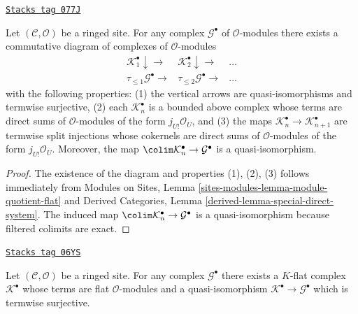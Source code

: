 \begin{lemma}
\label{sites-cohomology-lemma-resolution-by-direct-sums-extensions-by-zero}
\href{https://stacks.math.columbia.edu/tag/077J}{\texttt{Stacks tag 077J}}

Let $(\mathcal{C}, \mathcal{O})$ be a ringed site.
For any complex $\mathcal{G}^\bullet$ of $\mathcal{O}$-modules
there exists a commutative diagram of complexes of $\mathcal{O}$-modules
$$
\begin{array}{ccc}\mathcal{K}_1^\bullet \downarrow\longrightarrow & \mathcal{K}_2^\bullet \downarrow\longrightarrow & \ldots \\ \tau_{\leq 1}\mathcal{G}^\bullet \longrightarrow & \tau_{\leq 2}\mathcal{G}^\bullet \longrightarrow & \ldots\end{array}
$$
with the following properties: (1) the vertical arrows are quasi-isomorphisms
and termwise surjective,
(2) each $\mathcal{K}_n^\bullet$ is a bounded above complex whose terms
are direct sums of $\mathcal{O}$-modules of the form $j_{U!}\mathcal{O}_U$, and
(3) the maps $\mathcal{K}_n^\bullet \to \mathcal{K}_{n + 1}^\bullet$ are
termwise split injections whose cokernels are direct sums of
$\mathcal{O}$-modules of the form $j_{U!}\mathcal{O}_U$. Moreover, the map
$\colim \mathcal{K}_n^\bullet \to \mathcal{G}^\bullet$ is a quasi-isomorphism.
\end{lemma}

\begin{proof}
The existence of the diagram and properties (1), (2), (3) follows immediately
from
Modules on Sites, Lemma \ref{sites-modules-lemma-module-quotient-flat}
and
Derived Categories, Lemma \ref{derived-lemma-special-direct-system}.
The induced map
$\colim \mathcal{K}_n^\bullet \to \mathcal{G}^\bullet$
is a quasi-isomorphism because filtered colimits are exact.
\end{proof}

\begin{lemma}
\label{sites-cohomology-lemma-K-flat-resolution}
\href{https://stacks.math.columbia.edu/tag/06YS}{\texttt{Stacks tag 06YS}}

Let $(\mathcal{C}, \mathcal{O})$ be a ringed site. For any complex
$\mathcal{G}^\bullet$ there exists a $K$-flat complex $\mathcal{K}^\bullet$
whose terms are flat $\mathcal{O}$-modules and a quasi-isomorphism
$\mathcal{K}^\bullet \to \mathcal{G}^\bullet$ which is termwise surjective.
\end{lemma}

